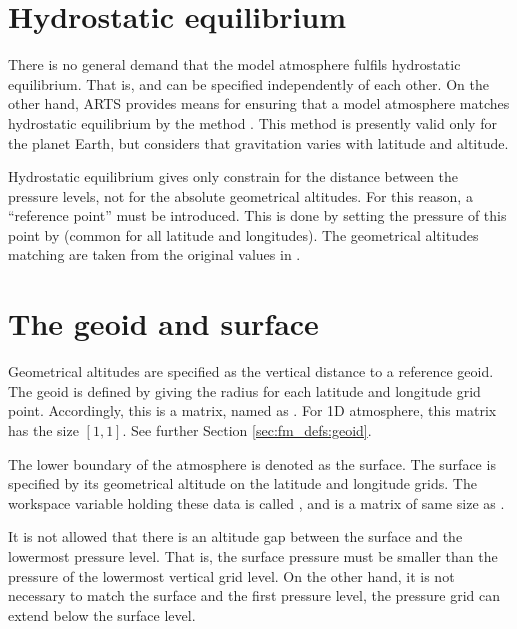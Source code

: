 \section{Hydrostatic equilibrium}
\label{sec:fm_defs:hse}

There is no general demand that the model atmosphere fulfils hydrostatic
equilibrium. That is,  and  can be
specified independently of each other. On the other hand, ARTS provides means
for ensuring that a model atmosphere matches hydrostatic equilibrium by the
method . This method is presently valid only for the
planet Earth, but considers that gravitation varies with latitude and altitude.

Hydrostatic equilibrium gives only constrain for the distance between the
pressure levels, not for the absolute geometrical altitudes. For this reason, a
``reference point'' must be introduced. This is done by setting the pressure of
this point by  (common for all latitude and longitudes). The
geometrical altitudes matching  are taken from the original
values in . 


\section{The geoid and surface}
\label{sec:fm_defs:surf}

Geometrical altitudes are specified as the vertical distance to a reference
geoid. The geoid is defined by giving the radius for each latitude and
longitude grid point. Accordingly, this is a matrix, named as
. For 1D atmosphere, this matrix has the size $[1,1]$.
See further Section \ref{sec:fm_defs:geoid}.

The lower boundary of the atmosphere is denoted as the surface. The surface is
specified by its geometrical altitude on the latitude and longitude grids.
The workspace variable holding these data is called , and
is a matrix of same size as .

It is not allowed that there is an altitude gap between the surface and
the lowermost pressure level.  That is, the surface pressure must be
smaller than the pressure of the lowermost vertical grid level. On
the other hand, it is not necessary to match the surface and the first
pressure level, the pressure grid can extend below the surface level.


